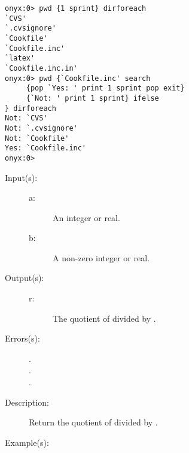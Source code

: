 \begin{description}
\begin{description}
\begin{verbatim}
onyx:0> pwd {1 sprint} dirforeach
`CVS'
`.cvsignore'
`Cookfile'
`Cookfile.inc'
`latex'
`Cookfile.inc.in'
onyx:0> pwd {`Cookfile.inc' search
     {pop `Yes: ' print 1 sprint pop exit}
     {`Not: ' print 1 sprint} ifelse
} dirforeach
Not: `CVS'
Not: `.cvsignore'
Not: `Cookfile'
Yes: `Cookfile.inc'
onyx:0>
		\end{verbatim}
	\end{description}
\label{systemdict:div}
\item[{\onyxop{a b}{div}{r}}: ]
	\begin{description}\item[]
	\item[Input(s): ]
		\begin{description}\item[]
		\item[a: ]
			An integer or real.
		\item[b: ]
			A non-zero integer or real.
		\end{description}
	\item[Output(s): ]
		\begin{description}\item[]
		\item[r: ]
			The quotient of  divided by .
		\end{description}
	\item[Errors(s): ]
		\begin{description}\item[]
		\item[.]
		\item[.]
		\item[.]
		\end{description}
	\item[Description: ]
		Return the quotient of  divided by .
	\item[Example(s): ]\begin{verbatim}


\end{verbatim}
\end{description}
\end{description}
